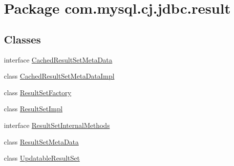\hypertarget{namespacecom_1_1mysql_1_1cj_1_1jdbc_1_1result}{}\section{Package com.\+mysql.\+cj.\+jdbc.\+result}
\label{namespacecom_1_1mysql_1_1cj_1_1jdbc_1_1result}
\subsection*{Classes}
\begin{DoxyCompactItemize}
\item 
interface \mbox{\hyperlink{interfacecom_1_1mysql_1_1cj_1_1jdbc_1_1result_1_1_cached_result_set_meta_data}{Cached\+Result\+Set\+Meta\+Data}}
\item 
class \mbox{\hyperlink{classcom_1_1mysql_1_1cj_1_1jdbc_1_1result_1_1_cached_result_set_meta_data_impl}{Cached\+Result\+Set\+Meta\+Data\+Impl}}
\item 
class \mbox{\hyperlink{classcom_1_1mysql_1_1cj_1_1jdbc_1_1result_1_1_result_set_factory}{Result\+Set\+Factory}}
\item 
class \mbox{\hyperlink{classcom_1_1mysql_1_1cj_1_1jdbc_1_1result_1_1_result_set_impl}{Result\+Set\+Impl}}
\item 
interface \mbox{\hyperlink{interfacecom_1_1mysql_1_1cj_1_1jdbc_1_1result_1_1_result_set_internal_methods}{Result\+Set\+Internal\+Methods}}
\item 
class \mbox{\hyperlink{classcom_1_1mysql_1_1cj_1_1jdbc_1_1result_1_1_result_set_meta_data}{Result\+Set\+Meta\+Data}}
\item 
class \mbox{\hyperlink{classcom_1_1mysql_1_1cj_1_1jdbc_1_1result_1_1_updatable_result_set}{Updatable\+Result\+Set}}
\end{DoxyCompactItemize}
